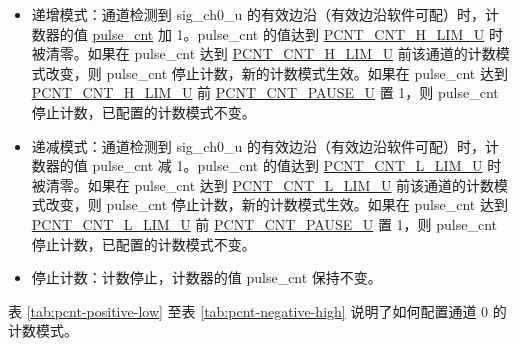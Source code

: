 \documentclass[main\_\_CN.tex]{subfiles}
\begin{document}
\begin{itemize}
\item 递增模式：通道检测到 sig\_ch0\_u 的有效边沿（有效边沿软件可配）时，计数器的值 \hyperref[fielddesc:PCNTPULSECNTUN]{pulse\_cnt} 加 1。pulse\_cnt 的值达到 \hyperref[fielddesc:PCNTCNTHLIMUN]{PCNT\_CNT\_H\_LIM\_U} 时被清零。如果在 pulse\_cnt 达到 \hyperref[fielddesc:PCNTCNTHLIMUN]{PCNT\_CNT\_H\_LIM\_U} 前该通道的计数模式改变，则 pulse\_cnt 停止计数，新的计数模式生效。如果在 pulse\_cnt 达到 \hyperref[fielddesc:PCNTCNTHLIMUN]{PCNT\_CNT\_H\_LIM\_U} 前 \hyperref[fielddesc:PCNTCNTPAUSEUN]{PCNT\_CNT\_PAUSE\_U} 置 1，则 pulse\_cnt 停止计数，已配置的计数模式不变。

\item 递减模式：通道检测到 sig\_ch0\_u 的有效边沿（有效边沿软件可配）时，计数器的值 pulse\_cnt 减 1。pulse\_cnt 的值达到 \hyperref[fielddesc:PCNTCNTLLIMUN]{PCNT\_CNT\_L\_LIM\_U} 时被清零。如果在 pulse\_cnt 达到 \hyperref[fielddesc:PCNTCNTLLIMUN]{PCNT\_CNT\_L\_LIM\_U} 前该通道的计数模式改变，则 pulse\_cnt 停止计数，新的计数模式生效。如果在 pulse\_cnt 达到 \hyperref[fielddesc:PCNTCNTLLIMUN]{PCNT\_CNT\_L\_LIM\_U} 前 \hyperref[fielddesc:PCNTCNTPAUSEUN]{PCNT\_CNT\_PAUSE\_U} 置 1，则 pulse\_cnt 停止计数，已配置的计数模式不变。

\item 停止计数：计数停止，计数器的值 pulse\_cnt 保持不变。
\end{itemize}


表 \ref{tab:pcnt-positive-low} \textit{} 至表 \ref{tab:pcnt-negative-high} \textit{} 说明了如何配置通道 0 的计数模式。
\end{document}
